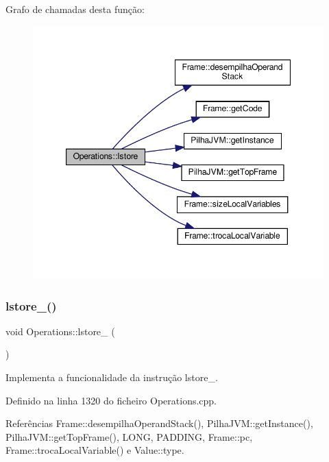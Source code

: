 Grafo de chamadas desta função\+:
\nopagebreak
\begin{figure}[H]
\begin{center}
\leavevmode
\includegraphics[width=347pt]{classOperations_a233917ec136fa6ce064f04b410e15f87_cgraph}
\end{center}
\end{figure}
\mbox{\label{classOperations_ae3c949d56a3ee685668134493595334b}} 
\subsubsection{\texorpdfstring{lstore\+\_()}{lstore\_0()}}
{\footnotesize\ttfamily void Operations\+::lstore\+\_ (\begin{DoxyParamCaption}{ }\end{DoxyParamCaption})\hspace{0.3cm}{\ttfamily [private]}}



Implementa a funcionalidade da instrução lstore\+\_. 



Definido na linha 1320 do ficheiro Operations.\+cpp.



Referências Frame\+::desempilha\+Operand\+Stack(), Pilha\+J\+V\+M\+::get\+Instance(), Pilha\+J\+V\+M\+::get\+Top\+Frame(), L\+O\+NG, P\+A\+D\+D\+I\+NG, Frame\+::pc, Frame\+::troca\+Local\+Variable() e Value\+::type.



